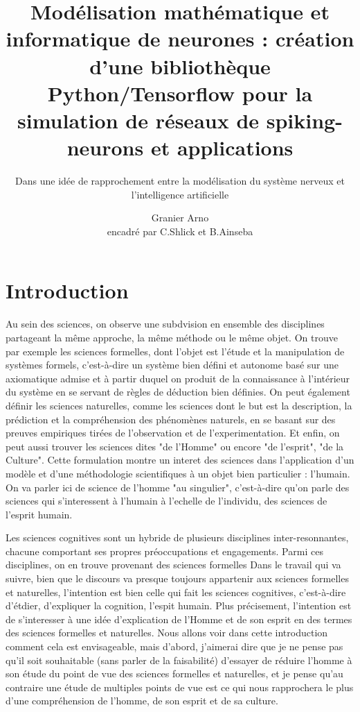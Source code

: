 \documentclass[12pt]{scrartcl}
\title{Modélisation mathématique et informatique de neurones : création d'une bibliothèque Python/Tensorflow pour la simulation de réseaux de spiking-neurons et applications}
\subtitle{Dans une idée de rapprochement entre la modélisation du système nerveux et l'intelligence artificielle}
\author{Granier Arno \\ encadré par C.Shlick et B.Ainseba}
\begin{document}
\maketitle

\tableofcontents

\pagebreak


\part{Introduction}
	
	

Au sein des sciences, on observe une subdvision en ensemble des disciplines partageant la même approche, la même méthode ou le même objet. On trouve par exemple les sciences formelles, dont l'objet est l'étude et la manipulation de systèmes formels, c'est-à-dire un système bien défini et autonome basé sur une axiomatique admise et à partir duquel on produit de la connaissance à l'intérieur du système en se servant de règles de déduction bien définies. On peut également définir les sciences naturelles, comme les sciences dont le but est la description, la prédiction et la compréhension des phénomènes naturels, en se basant sur des preuves empiriques tirées de l'observation et de l'experimentation. Et enfin, on peut aussi trouver les sciences dites "de l'Homme" ou encore "de l'esprit", "de la Culture". Cette formulation montre un interet des sciences dans l'application d'un modèle et d'une méthodologie scientifiques à un objet bien particulier : l'humain. On va parler ici de science de l'homme "au singulier", c'est-à-dire qu'on parle des sciences qui s'interessent à l'humain à l'echelle de l'individu, des sciences de l'esprit humain.


	 Les sciences cognitives sont un hybride de plusieurs disciplines inter-resonnantes, chacune comportant ses propres préoccupations et engagements. Parmi ces disciplines, on en trouve provenant des sciences formelles  Dans le travail qui va suivre, bien que le discours va presque toujours appartenir aux sciences formelles et naturelles, l'intention est bien celle qui fait les sciences cognitives, c'est-à-dire d'étdier, d'expliquer la cognition, l'espit humain. Plus précisement, l'intention est de s'interesser à une idée d'explication de l'Homme et de son esprit en des termes des sciences formelles et naturelles. Nous allons voir dans cette introduction comment cela est envisageable, mais d'abord, j'aimerai dire que je ne pense pas qu'il soit souhaitable (sans parler de la faisabilité) d'essayer de réduire l'homme à son étude du point de vue des sciences formelles et naturelles, et je pense qu'au contraire une étude de multiples points de vue est ce qui nous rapprochera le plus d'une compréhension de l'homme, de son esprit et de sa culture.
\end{document}
